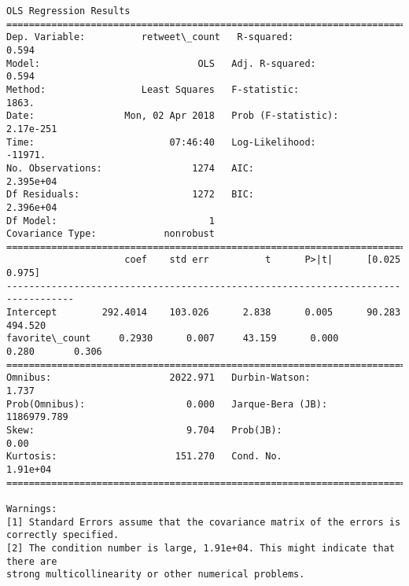 \documentclass[11pt]{article}
\begin{document}
    \begin{Verbatim}[commandchars=\\\{\}]
                            OLS Regression Results                            
==============================================================================
Dep. Variable:          retweet\_count   R-squared:                       0.594
Model:                            OLS   Adj. R-squared:                  0.594
Method:                 Least Squares   F-statistic:                     1863.
Date:                Mon, 02 Apr 2018   Prob (F-statistic):          2.17e-251
Time:                        07:46:40   Log-Likelihood:                -11971.
No. Observations:                1274   AIC:                         2.395e+04
Df Residuals:                    1272   BIC:                         2.396e+04
Df Model:                           1                                         
Covariance Type:            nonrobust                                         
==================================================================================
                     coef    std err          t      P>|t|      [0.025      0.975]
----------------------------------------------------------------------------------
Intercept        292.4014    103.026      2.838      0.005      90.283     494.520
favorite\_count     0.2930      0.007     43.159      0.000       0.280       0.306
==============================================================================
Omnibus:                     2022.971   Durbin-Watson:                   1.737
Prob(Omnibus):                  0.000   Jarque-Bera (JB):          1186979.789
Skew:                           9.704   Prob(JB):                         0.00
Kurtosis:                     151.270   Cond. No.                     1.91e+04
==============================================================================

Warnings:
[1] Standard Errors assume that the covariance matrix of the errors is correctly specified.
[2] The condition number is large, 1.91e+04. This might indicate that there are
strong multicollinearity or other numerical problems.

    \end{Verbatim}

    \begin{center}
    \end{center}
    { \hspace*{\fill} \\}
    
\end{document}
